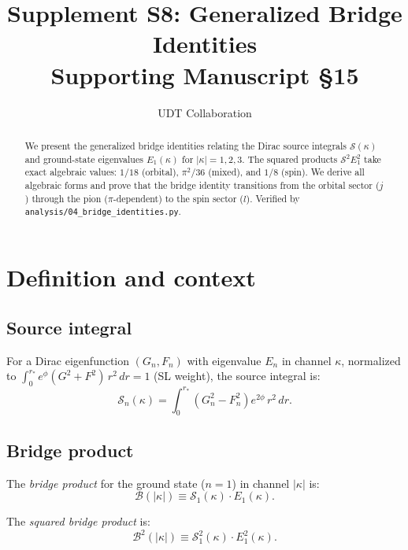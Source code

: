 \documentclass[11pt,letterpaper]{article}
\title{Supplement S8: Generalized Bridge Identities \\
\large Supporting Manuscript \S15}
\author{UDT Collaboration}
\date{}
\numberwithin{equation}{section}
\begin{document}
\maketitle

\begin{abstract}
We present the generalized bridge identities relating the Dirac source
integrals $\mathcal{S}(\kappa)$ and ground-state eigenvalues $E_1(\kappa)$
for $|\kappa| = 1, 2, 3$. The squared products
$\mathcal{S}^2 E_1^2$ take exact algebraic values:
$1/18$ (orbital), $\pi^2/36$ (mixed), and $1/8$ (spin).
We derive all algebraic forms and prove that the bridge identity transitions
from the orbital sector ($j$) through the pion ($\pi$-dependent) to the
spin sector ($l$). Verified by \texttt{analysis/04\_bridge\_identities.py}.
\end{abstract}

\tableofcontents

\section{Definition and context}
\label{sec:definition}

\subsection{Source integral}

For a Dirac eigenfunction $(G_n, F_n)$ with eigenvalue $E_n$ in channel
$\kappa$, normalized to
$\int_0^{r_*} e^{\phi}(G^2 + F^2)\,r^2\,dr = 1$ (SL weight), the
source integral is:
\begin{equation}
\label{eq:source_def}
  \mathcal{S}_n(\kappa) = \int_0^{r_*}\!\left(G_n^2 - F_n^2\right)e^{2\phi}\,r^2\,dr.
\end{equation}

\subsection{Bridge product}

The \emph{bridge product} for the ground state ($n=1$) in channel $|\kappa|$ is:
\begin{equation}
\label{eq:bridge_def}
  \mathcal{B}(|\kappa|) \equiv \mathcal{S}_1(\kappa) \cdot E_1(\kappa).
\end{equation}

The \emph{squared bridge product} is:
\begin{equation}
\label{eq:bridge2_def}
  \mathcal{B}^2(|\kappa|) \equiv \mathcal{S}_1^2(\kappa) \cdot E_1^2(\kappa).
\end{equation}
\end{document}
